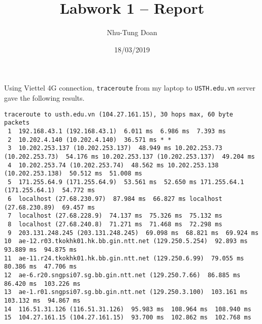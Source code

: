 \documentclass[12pt]{article}
\title{Labwork 1 -- Report}
\author{Nhu-Tung Doan}
\date{18/03/2019}
\begin{document}
\maketitle

Using Viettel 4G connection, \texttt{traceroute} from my laptop to \texttt{USTH.edu.vn} server gave the following results.

\begin{verbatim}
traceroute to usth.edu.vn (104.27.161.15), 30 hops max, 60 byte packets
 1  192.168.43.1 (192.168.43.1)  6.011 ms  6.986 ms  7.393 ms
 2  10.202.4.140 (10.202.4.140)  36.571 ms * *
 3  10.202.253.137 (10.202.253.137)  48.949 ms 10.202.253.73 (10.202.253.73)  54.176 ms 10.202.253.137 (10.202.253.137)  49.204 ms
 4  10.202.253.74 (10.202.253.74)  48.562 ms 10.202.253.138 (10.202.253.138)  50.512 ms  51.008 ms
 5  171.255.64.9 (171.255.64.9)  53.561 ms  52.650 ms 171.255.64.1 (171.255.64.1)  54.772 ms
 6  localhost (27.68.230.97)  87.984 ms  66.827 ms localhost (27.68.230.89)  69.457 ms
 7  localhost (27.68.228.9)  74.137 ms  75.326 ms  75.132 ms
 8  localhost (27.68.240.8)  71.271 ms  71.468 ms  72.298 ms
 9  203.131.248.245 (203.131.248.245)  69.098 ms  68.821 ms  69.924 ms
10  ae-12.r03.tkokhk01.hk.bb.gin.ntt.net (129.250.5.254)  92.893 ms  93.889 ms  94.875 ms
11  ae-11.r24.tkokhk01.hk.bb.gin.ntt.net (129.250.6.99)  79.055 ms  80.386 ms  47.706 ms
12  ae-6.r20.sngpsi07.sg.bb.gin.ntt.net (129.250.7.66)  86.885 ms  86.420 ms  103.226 ms
13  ae-1.r01.sngpsi07.sg.bb.gin.ntt.net (129.250.3.100)  103.161 ms  103.132 ms  94.867 ms
14  116.51.31.126 (116.51.31.126)  95.983 ms  108.964 ms  108.940 ms
15  104.27.161.15 (104.27.161.15)  93.700 ms  102.862 ms  102.768 ms
\end{verbatim}
\end{document}
